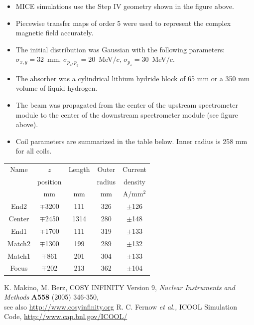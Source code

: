 \documentclass[portrait,a0paper,fontscale=0.285]{baposter} %
\begin{document}
\begin{poster}
{
\begin{itemize}
\item MICE simulations use the Step IV geometry shown in the figure above.
\item Piecewise transfer maps of order 5 were used to represent the complex magnetic field accurately.
\item The initial distribution was Gaussian with the following parameters: $\sigma_{x,y}=32$~mm, $\sigma_{p_x,p_y}=20$~MeV$/c$, $\sigma_{p_z}=30$~MeV$/c$.
\item The absorber was a cylindrical lithium hydride block of 65 mm or a 350 mm volume of liquid hydrogen.
\item The beam was propagated from the center of the upstream spectrometer module to the center of the downstream spectrometer module (see figure above).
\item Coil parameters are summarized in the table below. Inner radius is 258 mm for all coils.
\end{itemize}
\begin{footnotesize}
\begin{tabularx}{\columnwidth}{ccccc}
\toprule
Name & $z$ & Length & Outer & Current \\
 & position & & radius & density \\
 & mm & mm & mm & A/mm$^2$  \\
\midrule
	End2 & $\mp$3200 &111  &326 &$\pm$126 \\
	Center&$\mp$2450 &1314 &280 &$\pm$148 \\
	End1 & $\mp$1700 & 111 & 319 & $\pm$133 \\
	Match2 & $\mp$1300 & 199 & 289 & $\pm$132 \\
	Match1 & $\mp$861 & 201 & 304 & $\pm133$ \\
	Focus & $\mp$202 & 213 & 362 & $\pm$104 \\ 
\bottomrule
\end{tabularx}
\end{footnotesize}
}


{
\renewcommand{\section}[2]{}%
\begin{footnotesize}
%
\begin{thebibliography}{9}
K. Makino, M. Berz, COSY INFINITY Version 9, \emph{Nuclear Instruments and Methods} \textbf{A558} (2005) 346-350,\\ see also \url{http://www.cosyinfinity.org}
R. C. Fernow \emph{et al.,} ICOOL Simulation Code, \url{http://www.cap.bnl.gov/ICOOL/}


\end{thebibliography}
\end{footnotesize}}
\end{poster}
\end{document}
